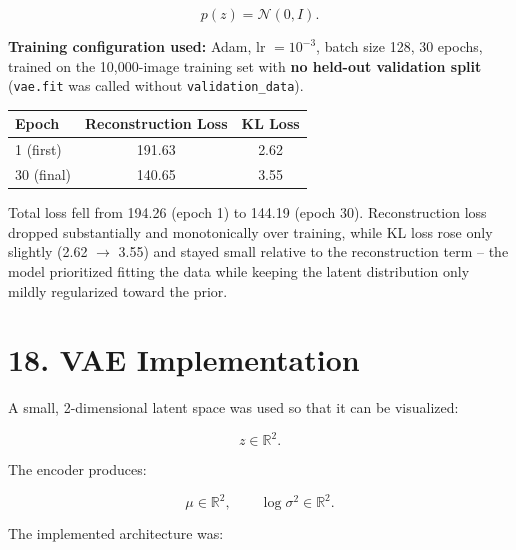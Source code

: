 \documentclass[10pt]{article}
\begin{document}
\[
p(z)=\mathcal{N}(0,I).
\]

\textbf{Training configuration used:} Adam, lr $=10^{-3}$, batch size 128,
30 epochs, trained on the 10,000-image training set with \textbf{no
held-out validation split} (\texttt{vae.fit} was called without
\texttt{validation\_data}).

\begin{center}
\begin{tabular}{|l|c|c|}
\hline
Epoch & Reconstruction Loss & KL Loss\\
\hline
1 (first)  & 191.63 & 2.62\\
30 (final) & 140.65 & 3.55\\
\hline
\end{tabular}
\end{center}

Total loss fell from 194.26 (epoch 1) to 144.19 (epoch 30). Reconstruction
loss dropped substantially and monotonically over training, while KL loss
rose only slightly (2.62 $\rightarrow$ 3.55) and stayed small relative to
the reconstruction term -- the model prioritized fitting the data while
keeping the latent distribution only mildly regularized toward the prior.

\section*{18. VAE Implementation}

A small, 2-dimensional latent space was used so that it can be visualized:

\[
z\in\mathbb{R}^{2}.
\]

The encoder produces:

\[
\mu\in\mathbb{R}^{2},
\qquad
\log\sigma^2\in\mathbb{R}^{2}.
\]

The implemented architecture was:

\begin{center}
\end{center}
\end{document}
